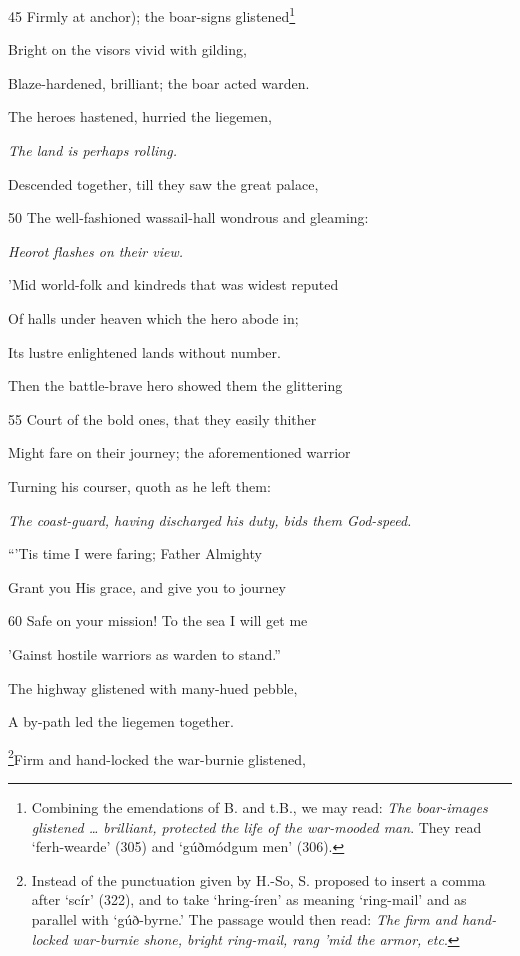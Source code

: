 45
Firmly at anchor); the boar-signs glistened\footnote{Combining the emendations of B. and t.B., we may read: \emph{The boar-images
glistened … brilliant, protected the life of the war-mooded man}. They
read ‘ferh-wearde’ (305) and ‘gúðmódgum men’ (306).}

Bright on the visors vivid with gilding,

Blaze-hardened, brilliant; the boar acted warden.

The heroes hastened, hurried the liegemen,

\emph{The land is perhaps
rolling.}

Descended together, till they saw the great palace,

50
The well-fashioned wassail-hall wondrous and gleaming:

\emph{Heorot flashes on
their view.}

’Mid world-folk and kindreds that was widest reputed

Of halls under heaven which the hero abode in;

Its lustre enlightened lands without number.

Then the battle-brave hero showed them the glittering

55
Court of the bold ones, that they easily thither

Might fare on their journey; the aforementioned warrior

Turning his courser, quoth as he left them:

\emph{The coast-guard,
having discharged
his duty, bids them
God-speed.}

“’Tis time I were faring; Father Almighty

Grant you His grace, and give you to journey

60
Safe on your mission! To the sea I will get me

’Gainst hostile warriors as warden to stand.”



The highway glistened with many-hued pebble,

A by-path led the liegemen together.

\footnote{Instead of the punctuation given by H.-So, S. proposed to insert a comma
after ‘scír’ (322), and to take ‘hring-íren’ as meaning ‘ring-mail’ and as
parallel with ‘gúð-byrne.’ The passage would then read: \emph{The firm and
hand-locked war-burnie shone, bright ring-mail, rang ’mid the armor, etc}.}Firm and hand-locked the war-burnie glistened,

